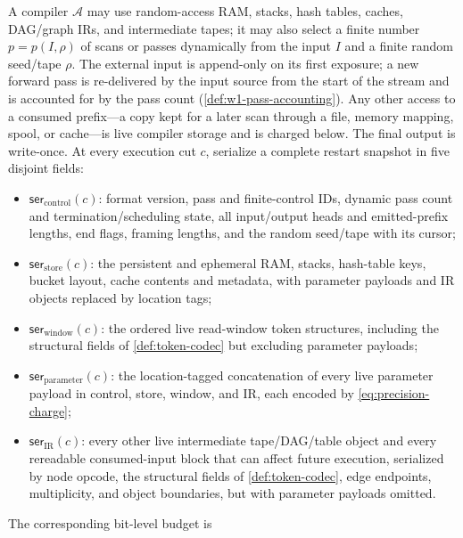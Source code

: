 \begin{definition}
\label{supp:def:compiler}
A compiler $\mathcal A$ may use random-access RAM, stacks, hash tables,
caches, DAG/graph IRs, and intermediate tapes; it may also select a finite
number $p=p(I,\rho)$ of scans or passes dynamically from the input $I$ and
a finite random seed/tape $\rho$.  The external input is append-only on its
first exposure; a new forward pass is re-delivered by the input source from
the start of the stream and is accounted for by the pass count
(\cref{def:w1-pass-accounting}).  Any other access to a consumed
prefix---a copy kept for a later scan through a file, memory mapping,
spool, or cache---is live compiler storage and is charged below.  The final output is write-once.
At every execution cut $c$, serialize a complete restart snapshot in five
disjoint fields:
\begin{itemize}[leftmargin=1.5em]
    \item $\mathsf{ser}_{\mathrm{control}}(c)$: format version, pass and
    finite-control IDs, dynamic pass count and termination/scheduling state,
    all input/output heads and emitted-prefix lengths, end flags, framing
    lengths, and the random seed/tape with its cursor;
    \item $\mathsf{ser}_{\mathrm{store}}(c)$: the persistent and ephemeral
    RAM, stacks, hash-table keys, bucket layout, cache contents and metadata,
    with parameter payloads and IR objects replaced by location tags;
    \item $\mathsf{ser}_{\mathrm{window}}(c)$: the ordered live read-window
    token structures, including the structural fields of
    \cref{def:token-codec} but excluding parameter payloads;
    \item $\mathsf{ser}_{\mathrm{parameter}}(c)$: the location-tagged
    concatenation of every live parameter payload in control, store, window,
    and IR, each encoded by \eqref{eq:precision-charge};
    \item $\mathsf{ser}_{\mathrm{IR}}(c)$: every other live intermediate
    tape/DAG/table object and every rereadable consumed-input block that can
    affect future execution, serialized by node opcode, the structural
    fields of \cref{def:token-codec}, edge endpoints, multiplicity, and
    object boundaries, but with parameter payloads omitted.
\end{itemize}
The corresponding bit-level budget is
\begin{equation}
\label{supp:eq:info-budget}

\end{equation}
\end{definition}
